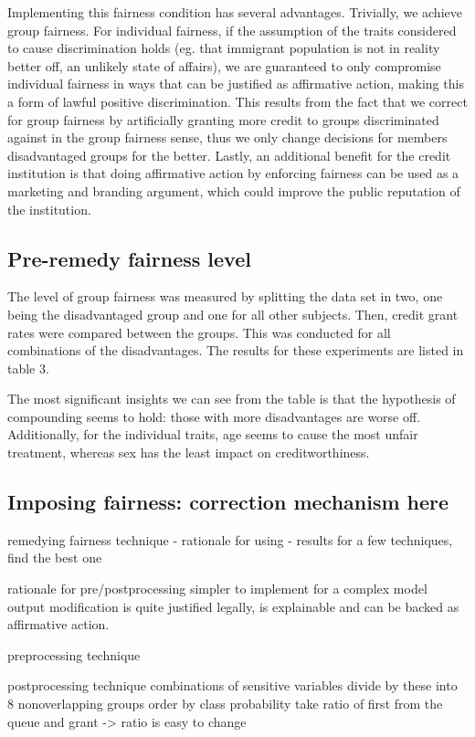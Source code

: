 \documentclass{article}
\begin{document}
Implementing this fairness condition has several advantages. Trivially, we achieve group fairness. For individual fairness,
if the assumption of the traits considered to cause discrimination holds (eg. that immigrant population is not 
in reality better off, an unlikely state of affairs), we are guaranteed to only compromise individual fairness in 
ways that can be justified as affirmative action, making this a form of lawful positive discrimination.
This results from the fact that we correct for group fairness by artificially granting more credit to 
groups discriminated against in the group fairness sense, thus we only change decisions for members disadvantaged groups for the better.
Lastly, an additional benefit for the credit institution is that doing affirmative action by enforcing fairness
can be used as a marketing and branding argument, which could improve the public reputation of the institution.

\subsection*{Pre-remedy fairness level}

The level of group fairness was measured by splitting the data set in two, 
one being the disadvantaged group and one for all other subjects. Then, 
credit grant rates were compared between the groups. This was conducted for all 
combinations of the disadvantages. The results for these experiments are listed in table 3. \cite{stanley}

The most significant insights we can see from the table is that the hypothesis of compounding seems to hold:
those with more disadvantages are worse off. 
Additionally, for the individual traits,  age seems 
to cause the most unfair treatment, whereas sex has the least impact on creditworthiness.

\subsection*{Imposing fairness: correction mechanism here}
remedying fairness 
technique - rationale for using - results
for a few techniques, find the best one

rationale for pre/postprocessing
simpler to implement for a complex model
    output modification is quite justified legally, is explainable and can be backed as affirmative action.

preprocessing technique 

postprocessing technique
combinations of sensitive variables
    divide by these into 8 nonoverlapping groups 
order by class probability 
take ratio of first from the queue and grant -> ratio is easy to change
\end{document}
